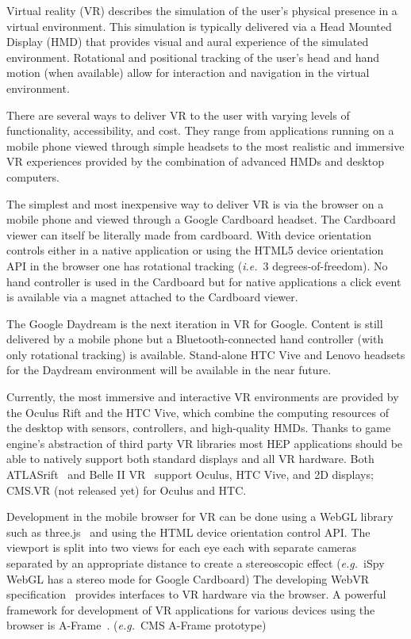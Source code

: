 \documentclass[12pt,a4paper]{article}
\begin{document}
Virtual reality (VR) describes the simulation of the user’s physical presence in a virtual environment. This simulation
is typically delivered via a Head Mounted Display (HMD) that provides visual and aural experience of the simulated environment.
Rotational and positional tracking of the user’s head and hand motion (when available) allow for interaction and navigation
in the virtual environment.

There are several ways to deliver VR to the user with varying levels of functionality, accessibility, and cost.
They range from applications running on a mobile phone viewed through simple headsets to the most realistic and
immersive VR experiences provided by the combination of advanced HMDs and desktop computers.

The simplest and most inexpensive way to deliver VR is via the browser on a mobile phone and viewed through a
Google Cardboard headset. The Cardboard viewer can itself be literally made from cardboard. With device orientation
controls either in a native application or using the HTML5 device orientation API in the browser one has rotational
tracking ({\it i.e.}\ 3 degrees-of-freedom). No hand controller is used in the Cardboard but for native applications a click event
is available via a magnet attached to the Cardboard viewer.

The Google Daydream is the next iteration in VR for Google. Content is still delivered by a mobile phone but a
Bluetooth-connected hand controller (with only rotational tracking) is available. Stand-alone HTC Vive and Lenovo
headsets for the Daydream environment will be available in the near future.

Currently, the most immersive and interactive VR environments are provided by the Oculus Rift and the HTC Vive,
which combine the computing resources of the desktop with sensors, controllers, and high-quality HMDs. Thanks to
game engine’s abstraction of third party VR libraries most HEP applications should be able to natively support both
standard displays and all VR hardware. Both ATLASrift~\cite{ATLASRift} and Belle II VR~\cite{BelleIIVR} support Oculus, HTC Vive,
and 2D displays; CMS.VR (not released yet) for Oculus and HTC.

Development in the mobile browser for VR can be done using a WebGL library such as three.js~\cite{ThreeJS} and using the
HTML device orientation control API. The viewport is split into two views for each eye each with separate cameras separated
by an appropriate distance to create a stereoscopic effect ({\it e.g.}\ iSpy WebGL has a stereo mode for Google Cardboard)
The developing WebVR specification~\cite{WebVR} provides interfaces to VR hardware via the browser. A powerful framework for
development of VR applications for various devices using the browser is A-Frame~\cite{AFrame}. ({\it e.g.}\ CMS A-Frame prototype)
\end{document}
